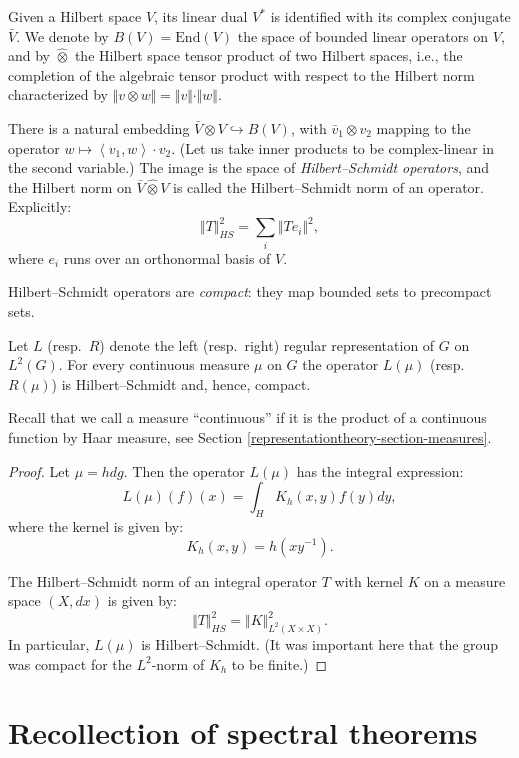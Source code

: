 Given a Hilbert space $V$, its linear dual $V^*$ is identified with its complex conjugate $\bar V$. We denote by $B(V)=\text{End}(V)$ the space of bounded linear operators on $V$, and by $\hat\otimes$ the Hilbert space tensor product of two Hilbert spaces, i.e., the completion of the algebraic tensor product with respect to the Hilbert norm characterized by $\Vert v \otimes w\Vert = \Vert v\Vert\cdot \Vert w \Vert$.

There is a natural embedding $\bar V\hat\otimes V \hookrightarrow B(V)$, with $\bar v_1 \otimes v_2$ mapping 
to the operator 
$ w\mapsto \left<v_1, w\right> \cdot v_2$.
(Let us take inner products to be complex-linear in the second variable.) The image is the space of {\it Hilbert--Schmidt operators}, and the Hilbert norm on $\bar V\hat\otimes V$ is called the Hilbert--Schmidt norm of an operator. Explicitly:
$$\Vert T\Vert_{HS}^2 = \sum_i \Vert Te_i\Vert^2,$$
where $e_i$ runs over an orthonormal basis of $V$. 

Hilbert--Schmidt operators are {\it compact}: they map bounded sets to precompact sets. 


\begin{proposition}
\label{proposition-continuousconvolution-compact}
 Let $L$ (resp.\ $R$) denote the left (resp.\ right) regular representation of $G$ on $L^2(G)$. For every continuous measure $\mu$ on $G$ the operator $L(\mu)$ (resp.\ $R(\mu)$) is Hilbert--Schmidt and, hence, compact.
\end{proposition}

Recall that we call a measure ``continuous'' if it is the product of a continuous function by Haar measure, see Section \ref{representationtheory-section-measures}.

\begin{proof}
 Let $\mu=h dg$. Then the operator $L(\mu)$ has the integral expression:
$$ L(\mu)(f)(x) = \int_{H} K_h(x,y) f(y) dy,$$
where the kernel is given by:
$$ K_h(x,y) = h(xy^{-1}).$$

The Hilbert--Schmidt norm of an integral operator $T$ with kernel $K$ on a measure space $(X,dx)$ is given by:
$$ \Vert T\Vert_{HS}^2= \Vert K\Vert^2_{L^2(X\times X)}.$$
In particular, $L(\mu)$ is Hilbert--Schmidt. (It was important here that the group was compact for the $L^2$-norm of $K_h$ to be finite.) 
\end{proof}



\section{Recollection of spectral theorems}
\label{section-recollection-spectraltheorems}

